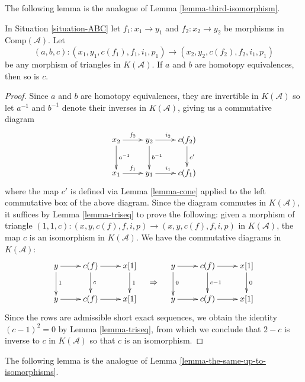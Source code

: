 \noindent
The following lemma is the analogue of
Lemma \ref{lemma-third-isomorphism}.

\begin{lemma}
\label{lemma-analogue-third-isomorphism}
In Situation \ref{situation-ABC} let $f_1 : x_1 \to y_1$ and
$f_2 : x_2 \to y_2$ be morphisms in $\text{Comp}(\mathcal{A})$. Let 
$$
(a,b,c): (x_1,y_1,c(f_1), f_1, i_1, p_1) \to (x_2,y_2, c(f_2), f_2, i_1, p_1)
$$
be any morphism of triangles in $K(\mathcal{A})$.
If $a$ and $b$ are homotopy equivalences, then so is $c$. 
\end{lemma}

\begin{proof}
Since $a$ and $b$ are homotopy equivalences, they are invertible in
$K(\mathcal{A})$ so let $a^{-1}$ and $b^{-1}$ denote their inverses
in $K(\mathcal{A})$, giving us a commutative diagram 
$$
\xymatrix{
x_2\ar[d]^{a^{-1}}\ar[r]^{f_2} &
y_2\ar[d]^{b^{-1}}\ar[r]^{i_2} &
c(f_2)\ar[d]^{c'} \\
x_1\ar[r]^{f_1} &
y_1 \ar[r]^{i_1} &
c(f_1)
}
$$
where the map $c'$ is defined via Lemma \ref{lemma-cone} applied to the left
commutative box of the above diagram. Since the diagram commutes
in $K(\mathcal{A})$, it suffices by Lemma \ref{lemma-triseq} to
prove the following: given a morphism of triangle
$(1,1,c): (x,y,c(f),f,i,p)\to (x,y,c(f),f,i,p)$
in $K(\mathcal{A})$, the map $c$ is an isomorphism in
$K(\mathcal{A})$. We have the commutative diagrams in $K(\mathcal{A})$:
$$
\vcenter{
\xymatrix{
y\ar[d]^{1}\ar[r] &
c(f)\ar[d]^{c}\ar[r] &
x[1]\ar[d]^{1} \\
y\ar[r] &
c(f) \ar[r] &
x[1]
}
}
\quad\Rightarrow\quad
\vcenter{
\xymatrix{
y\ar[d]^{0}\ar[r] &
c(f)\ar[d]^{c-1}\ar[r] &
x[1]\ar[d]^{0} \\
y\ar[r] &
c(f) \ar[r] &
x[1]
}
}
$$
Since the rows are admissible short exact sequences, we obtain
the identity $(c-1)^2 = 0$ by Lemma \ref{lemma-triseq}, from
which we conclude that $2-c$ is inverse to $c$ in $K(\mathcal{A})$
so that $c$ is an isomorphism. 
\end{proof}

\noindent
The following lemma is the analogue of
Lemma \ref{lemma-the-same-up-to-isomorphisms}.

